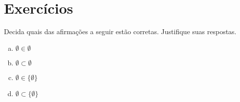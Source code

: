 \section{Exercícios}
\exercise Decida quais das afirmações a seguir estão corretas. Justifique suas respostas.
	\begin{enumerate}[a.]
		\item $\emptyset \in \emptyset$	
		\item $\emptyset \subset \emptyset$
		\item $\emptyset \in \{\emptyset\}$
		\item $\emptyset \subset \{\emptyset\}$
	\end{enumerate}


